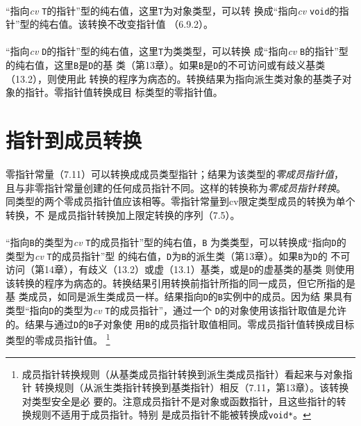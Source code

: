 \paragraph{}
``指向\textit{cv} \texttt{T}的指针''型的纯右值，这里\texttt{T}为对象类型，可以转
换成``指向\textit{cv} \texttt{void}的指针''型的纯右值。该转换不改变指针值
（6.9.2）。

\paragraph{}
``指向\textit{cv} \texttt{D}的指针''型的纯右值，这里\texttt{T}为类类型，可以转换
成``指向\textit{cv} \texttt{B}的指针''型的纯右值，这里\texttt{B}是\texttt{D}的基
类（第13章）。如果\texttt{B}是\texttt{D}的不可访问或有歧义基类（13.2），则使用此
转换的程序为病态的。转换结果为指向派生类对象的基类子对象的指针。零指针值转换成目
标类型的零指针值。

\section{指针到成员转换}
\paragraph{}
零指针常量（7.11）可以转换成成员类型指针；结果为该类型的\textit{零成员指针值}，
且与非零指针常量创建的任何成员指针不同。这样的转换称为\textit{零成员指针转换}。
同类型的两个零成员指针值应该相等。零指针常量到cv限定类型成员的转换为单个转换，不
是成员指针转换加上限定转换的序列（7.5）。

\paragraph{}
``指向\texttt{B}的类型为\textit{cv} \texttt{T}的成员指针''型的纯右值，\texttt{B}
为类类型，可以转换成``指向\texttt{D}的类型为\textit{cv} \texttt{T}的成员指针''型
的纯右值，\texttt{D}为\texttt{B}的派生类（第13章）。如果\texttt{B}为\texttt{D}的
不可访问（第14章），有歧义（13.2）或虚（13.1）基类，或是\texttt{D}的虚基类的基类
则使用该转换的程序为病态的。转换结果引用转换前指针所指的同一成员，但它所指的是基
类成员，如同是派生类成员一样。结果指向\texttt{D}的\texttt{B}实例中的成员。因为结
果具有类型``指向\texttt{D}的类型为\textit{cv} \texttt{T}的成员指针''，通过一个
\texttt{D}的对象使用该指针取值是允许的。结果与通过\texttt{D}的\texttt{B}子对象使
用\texttt{B}的成员指针取值相同。零成员指针值转换成目标类型的零成员指针值。
\footnote{成员指针转换规则（从基类成员指针转换到派生类成员指针）看起来与对象指针
转换规则（从派生类指针转换到基类指针）相反（7.11，第13章）。该转换对类型安全是必
要的。注意成员指针不是对象或函数指针，且这些指针的转换规则不适用于成员指针。特别
是成员指针不能被转换成\texttt{void*}。}

